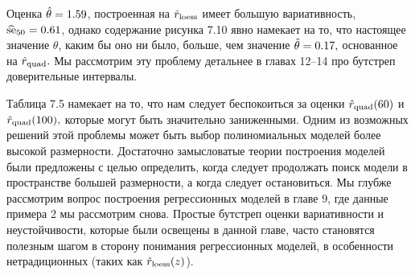 Оценка $\hat \theta = 1.59$, построенная на $\hat{r}_{\text{loess}}$ имеет большую вариативность, $\widehat{\text{se}}_{50} = 0.61$, однако содержание рисунка 7.10 явно намекает на то, что настоящее значение $\theta$, каким бы оно ни было, больше, чем значение $\hat \theta = 0.17,$ основанное на $\hat{r}_{\text{quad}}.$ Мы рассмотрим эту проблему детальнее в главах 12--14 про бутстреп доверительные интервалы.

Таблица 7.5 намекает на то, что нам следует беспокоиться за оценки $\hat{r}_{\text{quad}}(60)$ и $\hat{r}_{\text{quad}}(100),$ которые могут быть значительно заниженными. Одним из возможных решений этой проблемы может быть выбор полиномиальных моделей более высокой размерности. Достаточно замысловатые теории построения моделей были предложены с целью определить, когда следует продолжать поиск модели в пространстве большей размерности, а когда следует остановиться. Мы глубже рассмотрим вопрос построения регрессионных моделей в главе 9, где данные примера 2 мы рассмотрим снова. Простые бутстреп оценки вариативности и неустойчивости, которые были освещены в данной главе, часто становятся полезным шагом в сторону понимания регрессионных моделей, в особенности нетрадиционных (таких как $\hat{r}_{\text{loess}}(z)$).